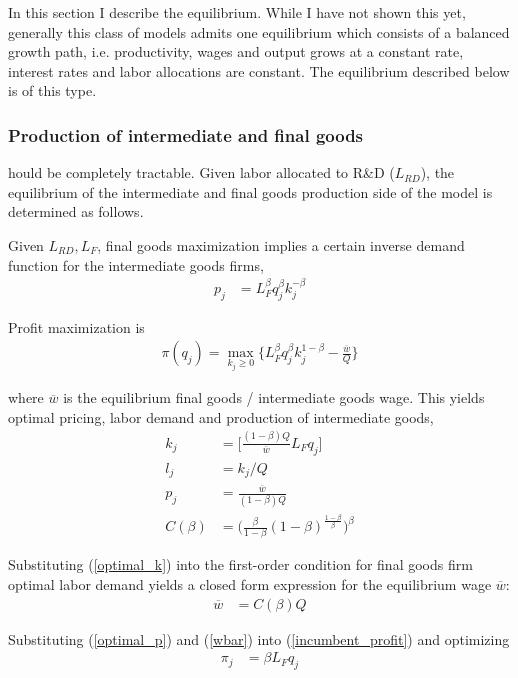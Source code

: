 \documentclass[11pt,english]{article}
\theoremstyle{remark}
\begin{document}
In this section I describe the equilibrium. While I have not shown this yet, generally this class of models admits one equilibrium which consists of a balanced growth path, i.e. productivity, wages and output grows at a constant rate, interest rates and labor allocations are constant. The equilibrium described below is of this type. 

\subsubsection{Production of intermediate and final goods}
hould be completely tractable. 
Given labor allocated to R\&D ($L_{RD}$), the equilibrium of the intermediate and final goods production side of the model is determined as follows. 

Given $L_{RD},L_F$, final goods maximization implies a certain inverse demand function for the intermediate goods firms, 
\begin{align*}
	p_j &= L_F^{\beta} q_j^{\beta} k_j^{-\beta}	
\end{align*}

Profit maximization is
\begin{align}
\pi(q_j) = \max_{k_j \ge 0} \Big\{ L_F^{\beta} q_j^{\beta} k_j^{1-\beta} - \frac{\overline{w}}{Q} \Big\} \label{incumbent_profit}
\end{align}

where $\overline{w}$ is the equilibrium final goods / intermediate goods wage.
This yields optimal pricing, labor demand and production of intermediate goods,
\begin{align}
k_j &= \Big[ \frac{(1-\beta) Q}{\overline{w}} L_F q_j  \Big] \label{optimal_k}\\
l_j &= k_j / Q \label{optimal_l}\\
p_j &= \frac{\overline{w}}{(1-\beta) Q} \label{optimal_p}\\
C(\beta) &= \Big(\frac{\beta}{1-\beta} (1-\beta)^{\frac{1-\beta}{\beta}} \Big)^{\beta} \nonumber
\end{align}

Substituting (\ref{optimal_k}) into the first-order condition for final goods firm optimal labor demand yields a closed form expression for the equilibrium wage $\overline{w}$:
\begin{align}
	\overline{w} &= C(\beta) Q \label{wbar}
\end{align}

Substituting (\ref{optimal_p}) and (\ref{wbar}) into (\ref{incumbent_profit}) and optimizing
\begin{align}
\pi_j &= \beta L_F q_j \label{profits_eq}
\end{align}
\end{document}
